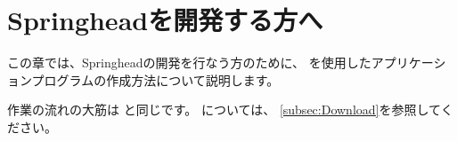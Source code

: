 \newpage
\section{Springheadを開発する方へ}
\label{sec:ForDevelopper}

\noindent
この章では、Springheadの開発を行なう方のために、
\cmake を使用したアプリケーションプログラムの作成方法について説明します。

\medskip
作業の流れの大筋は
と同じです。
については、
\ref{subsec:Download}を参照してください。


